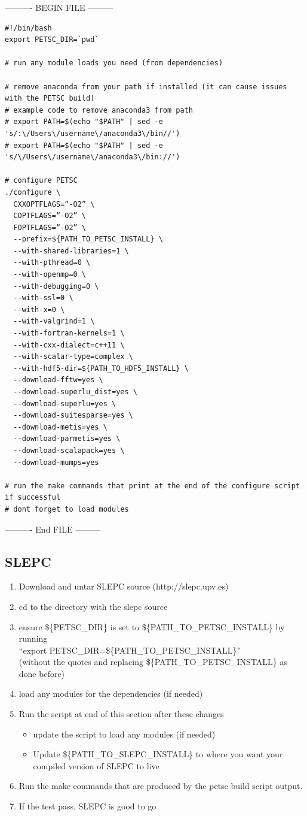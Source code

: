 \documentclass{article}
\begin{document}
---------- BEGIN FILE ---------
\begin{verbatim}
#!/bin/bash
export PETSC_DIR=`pwd`

# run any module loads you need (from dependencies)

# remove anaconda from your path if installed (it can cause issues with the PETSC build)
# example code to remove anaconda3 from path
# export PATH=$(echo "$PATH" | sed -e 's/:\/Users\/username\/anaconda3\/bin//')
# export PATH=$(echo "$PATH" | sed -e 's/\/Users\/username\/anaconda3\/bin://')

# configure PETSC
./configure \
  CXXOPTFLAGS=“-O2” \
  COPTFLAGS=“-O2” \
  FOPTFLAGS=“-O2” \
  --prefix=${PATH_TO_PETSC_INSTALL} \
  --with-shared-libraries=1 \
  --with-pthread=0 \
  --with-openmp=0 \
  --with-debugging=0 \
  --with-ssl=0 \
  --with-x=0 \
  --with-valgrind=1 \
  --with-fortran-kernels=1 \
  --with-cxx-dialect=c++11 \
  --with-scalar-type=complex \
  --with-hdf5-dir=${PATH_TO_HDF5_INSTALL} \
  --download-fftw=yes \
  --download-superlu_dist=yes \
  --download-superlu=yes \
  --download-suitesparse=yes \
  --download-metis=yes \
  --download-parmetis=yes \
  --download-scalapack=yes \
  --download-mumps=yes

# run the make commands that print at the end of the configure script if successful
# dont forget to load modules 
\end{verbatim}
---------- End FILE ---------

\subsection{SLEPC} %
\label{sub:slepc}

\begin{enumerate}
  \item Download and untar SLEPC source (http://slepc.upv.es)
  \item cd to the directory with the slepc source
  \item ensure \$\{PETSC\_DIR\} is set to \$\{PATH\_TO\_PETSC\_INSTALL\} by running \\``export PETSC\_DIR=\$\{PATH\_TO\_PETSC\_INSTALL\}'' \\(without the quotes and replacing \$\{PATH\_TO\_PETSC\_INSTALL\} as done before)
  \item load any modules for the dependencies (if needed)
  \item Run the script at end of this section after these changes
  \begin{itemize}
    \item update the script to load any modules (if needed)
    \item Update \$\{PATH\_TO\_SLEPC\_INSTALL\} to where you want your compiled version of SLEPC to live
  \end{itemize}
  \item Run the make commands that are produced by the petsc build script output.
  \item If the test pass, SLEPC is good to go
\end{enumerate}
\end{document}
